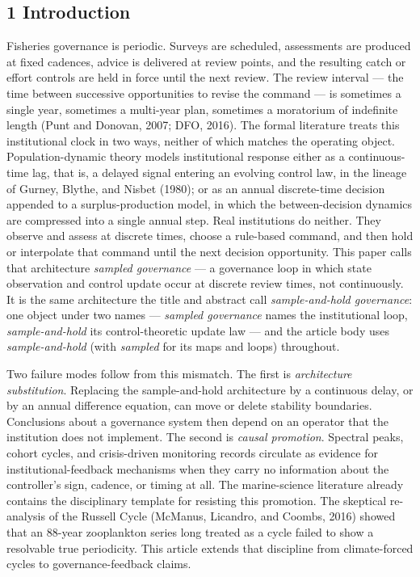 \documentclass[11pt]{article}
\begin{document}
\subsection{1 Introduction}\label{introduction}

Fisheries governance is periodic. Surveys are scheduled, assessments are
produced at fixed cadences, advice is delivered at review points, and
the resulting catch or effort controls are held in force until the next
review. The review interval --- the time between successive
opportunities to revise the command --- is sometimes a single year,
sometimes a multi-year plan, sometimes a moratorium of indefinite length
(Punt and Donovan, 2007; DFO, 2016). The formal literature treats this
institutional clock in two ways, neither of which matches the operating
object. Population-dynamic theory models institutional response either
as a continuous-time lag, that is, a delayed signal entering an evolving
control law, in the lineage of Gurney, Blythe, and Nisbet (1980); or as
an annual discrete-time decision appended to a surplus-production model,
in which the between-decision dynamics are compressed into a single
annual step. Real institutions do neither. They observe and assess at
discrete times, choose a rule-based command, and then hold or
interpolate that command until the next decision opportunity. This paper
calls that architecture \emph{sampled governance} --- a governance loop
in which state observation and control update occur at discrete review
times, not continuously. It is the same architecture the title and abstract call \emph{sample-and-hold
governance}: one object under two names --- \emph{sampled governance}
names the institutional loop, \emph{sample-and-hold} its
control-theoretic update law --- and the article body uses
\emph{sample-and-hold} (with \emph{sampled} for its maps and loops)
throughout.

Two failure modes follow from this mismatch. The first is
\emph{architecture substitution}. Replacing the sample-and-hold
architecture by a continuous delay, or by an annual difference equation,
can move or delete stability boundaries. Conclusions about a governance
system then depend on an operator that the institution does not
implement. The second is \emph{causal promotion}. Spectral peaks, cohort
cycles, and crisis-driven monitoring records circulate as evidence for
institutional-feedback mechanisms when they carry no information about
the controller's sign, cadence, or timing at all. The marine-science
literature already contains the disciplinary template for resisting this
promotion. The skeptical re-analysis of the Russell Cycle (McManus,
Licandro, and Coombs, 2016) showed that an 88-year zooplankton series
long treated as a cycle failed to show a resolvable true periodicity.
This article extends that discipline from climate-forced cycles to
governance-feedback claims.
\end{document}
